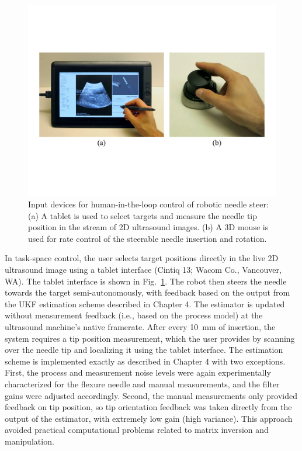 \begin{figure}[!t]
\centering
\includegraphics[width = \columnwidth]{./Images/Chapter5/InputDevices/InputDevices.pdf}%
\caption[Input devices for robot control]{Input devices for human-in-the-loop control of robotic needle steer: (a) A tablet is used to select targets and measure the needle tip position in the stream of 2D ultrasound images. (b) A 3D mouse is used for rate control of the steerable needle insertion and rotation.}
\label{fig:InputDevices}
\end{figure}  

In task-space control, the user selects target positions directly in the live 2D ultrasound image using a tablet interface (Cintiq 13; Wacom Co., Vancouver, WA). The tablet interface is shown in Fig.~\ref{fig:InputDevices}. The robot then steers the needle towards the target semi-autonomously, with feedback based on the output from the UKF estimation scheme described in Chapter 4. The estimator is updated without measurement feedback (i.e., based on the process model) at the ultrasound machine's native framerate. After every 10~mm of insertion, the system requires a tip position measurement, which the user provides by scanning over the needle tip and localizing it using the tablet interface. The estimation scheme is implemented exactly as described in Chapter 4 with two exceptions. First, the process and measurement noise levels were again experimentally characterized for the flexure needle and manual measurements, and the filter gains were adjusted accordingly. Second, the manual measurements only provided feedback on tip position, so tip orientation feedback was taken directly from the output of the estimator, with extremely low gain (high variance). This approach avoided practical computational problems related to matrix inversion and manipulation. 

